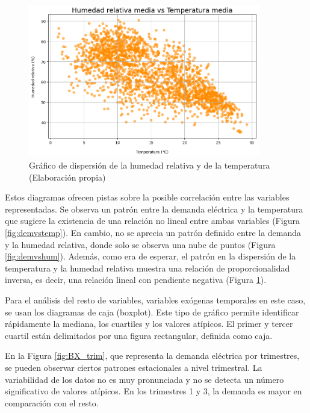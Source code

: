 \documentclass[12pt,a4paper]{report}
\begin{document}
\begin{figure}[H]
    \centering
    \includegraphics[width=0.9\textwidth]{Images/tfm-3.2C.png}
    \caption{Gráfico de dispersión de la humedad relativa y de la temperatura (Elaboración propia)}
    \label{fig:humvstemp}
\end{figure}

Estos diagramas ofrecen pistas sobre la posible correlación entre las variables representadas. Se observa un patrón entre la demanda eléctrica y la temperatura que sugiere la existencia de una relación no lineal entre ambas variables (Figura \ref{fig:demvstemp}). En cambio, no se aprecia un patrón definido entre la demanda y la humedad relativa, donde solo se observa una nube de puntos (Figura \ref{fig:demvshum}). Además, como era de esperar, el patrón en la dispersión de la temperatura y la humedad relativa muestra una relación de proporcionalidad inversa, es decir, una relación lineal con pendiente negativa (Figura \ref{fig:humvstemp}).

Para el análisis del resto de variables, variables exógenas temporales en este caso, se usan los diagramas de caja (boxplot). Este tipo de gráfico permite identificar rápidamente la mediana, los cuartiles y los valores atípicos. El primer y tercer cuartil están delimitados por una figura rectangular, definida como caja.

En la Figura \ref{fig:BX_trim}, que representa la demanda eléctrica por trimestres, se pueden observar ciertos patrones estacionales a nivel trimestral. La variabilidad de los datos no es muy pronunciada y no se detecta un número significativo de valores atípicos. En los trimestres 1 y 3, la demanda es mayor en comparación con el resto.
\end{document}
